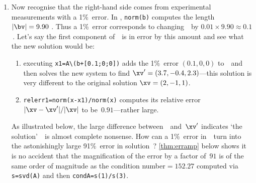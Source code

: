 \begin{example}
\begin{enumerate}
\item Now recognise that the right-hand side comes from experimental measurements with a 1\%~error.
In \script, \verb|norm(b)| computes the length \(|\bv|=9.90\) \twodp.
Thus a 1\%~error corresponds to changing~\bv\ by \(0.01\times 9.90\approx 0.1\)\,.
Let's say the first component of~\bv\ is in error by this amount and see what the new solution would be:
\setbox\ajrqrbox\hbox{}%
\marginpar{\usebox{\ajrqrbox\\[2ex]}}%
\begin{enumerate}
\item executing \verb|x1=A\(b+[0.1;0;0])| adds the  1\%~error \((0.1,0,0)\) to~\bv\ and then solves the new system to find \(\xv'=(3.7,-0.4,2.3)\)---this solution is very different to the original solution \(\xv=(2,-1,1)\).
\item \verb|relerr1=norm(x-x1)/norm(x)| computes its relative error \(|\xv-\xv'|/|\xv|\) to be~\(0.91\)---rather large.
\end{enumerate}
As illustrated below, the large difference between~\xv\ and~\(\xv'\) indicates `the solution'~\xv\ is almost complete nonsense.
How can a 1\%~error in~\bv\ turn into the astonishingly large 91\%~error in solution~\xv?  
\autoref{thm:erramp} below shows it is no accident that the magnification of the error by a factor of~\(91\) is of the same order of magnitude as the condition number\({}=152.27\) computed via \verb|s=svd(A)| and then \verb|condA=s(1)/s(3)|.
\begin{center}
\end{center}



\end{enumerate}
\end{example}
